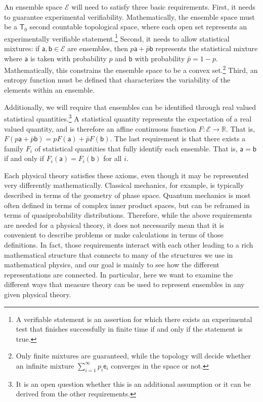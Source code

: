 \documentclass[10pt,twocolumn, nofootinbib]{revtex4-2}
\newcommand{\ens}[1][e] {\mathsf{#1}} %
\newcommand{\Ens}[1][E] {\mathcal{#1}} %
\begin{document}
An ensemble space $\Ens$ will need to satisfy three basic requirements. First, it needs to guarantee experimental verifiability. Mathematically, the ensemble space must be a $\mathsf{T}_0$ second countable topological space, where each open set represents an experimentally verifiable statement\cite{aop-book,kelly1996}.\footnote{A verifiable statement is an assertion for which there exists an experimental test that finishes successfully in finite time if and only if the statement is true.} Second, it needs to allow statistical mixtures: if $\ens[a],\ens[b] \in \Ens$ are ensembles, then $p \ens[a] + \bar{p} \ens[b]$ represents the statistical mixture where $\ens[a]$ is taken with probability $p$ and $\ens[b]$ with probability $\bar{p} = 1 - p$. Mathematically, this constrains the ensemble space to be a convex set.\footnote{Only finite mixtures are guaranteed, while the topology will decide whether an infinite mixture $\sum_{i=1}^{\infty} p_i \ens_i$ converges in the space or not.} Third, an entropy function must be defined that characterizes the variability of the elements within an ensemble.

Additionally, we will require that ensembles can be identified through real valued statistical quantities.\footnote{It is an open question whether this is an additional assumption or it can be derived from the other requirements.} A statistical quantity represents the expectation of a real valued quantity, and is therefore an affine continuous function $F : \Ens \to \mathbb{R}$. That is, $F(p \ens[a] + \bar{p} \ens[b]) = p F(\ens[a]) + \bar{p} F(\ens[b])$. The last requirement is that there exists a family $F_i$ of statistical quantities that fully identify each ensemble. That is, $\ens[a] = \ens[b]$ if and only if $F_i(\ens[a]) = F_i(\ens[b])$ for all $i$.

Each physical theory satisfies these axioms, even though it may be represented very differently mathematically. Classical mechanics, for example, is typically described in terms of the geometry of phase space. Quantum mechanics is most often defined in terms of complex inner product spaces, but can be reframed in terms of quasiprobability distributions. Therefore, while the above requirements are needed for a physical theory, it does not necessarily mean that it is convenient to describe problems or make calculations in terms of those definitions. In fact, those requirements interact with each other leading to a rich mathematical structure that connects to many of the structures we use in mathematical physics, and our goal is mainly to see how the different representations are connected. In particular, here we want to examine the different ways that measure theory can be used to represent ensembles in any given physical theory.
\end{document}
